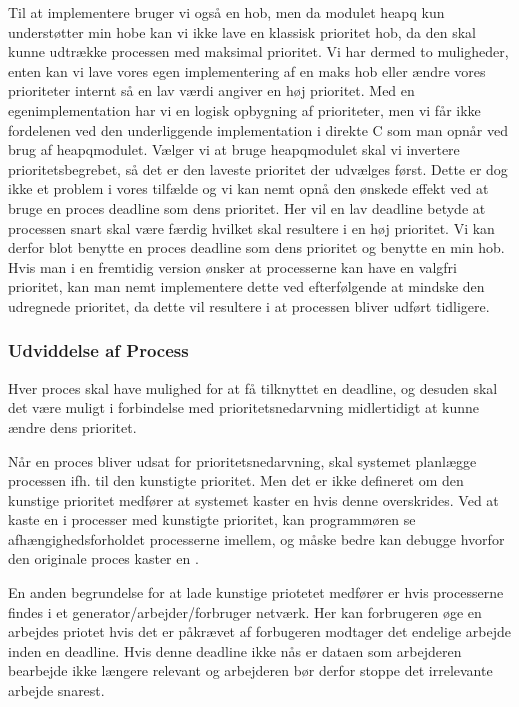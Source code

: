 Til at implementere  bruger vi også en hob, men da modulet heapq  kun understøtter min hobe kan vi ikke lave en klassisk prioritet hob, da den skal kunne udtrække processen med maksimal prioritet. Vi har dermed to muligheder, enten kan vi lave vores egen implementering af en maks hob eller ændre vores prioriteter internt så en lav værdi angiver en høj prioritet. Med en egenimplementation har vi en  logisk opbygning af prioriteter, men vi får ikke fordelenen ved den underliggende implementation i direkte C som man opnår ved brug af heapqmodulet. Vælger vi at bruge heapqmodulet skal vi invertere prioritetsbegrebet, så det er den laveste prioritet der udvælges først. Dette er dog ikke et problem  i vores tilfælde og vi kan nemt opnå den ønskede effekt ved at bruge en proces deadline som dens prioritet. Her vil en lav deadline betyde at processen snart skal være færdig hvilket skal resultere i en høj prioritet.
Vi kan derfor blot benytte en proces deadline som dens prioritet og benytte en min hob. Hvis man i en fremtidig version ønsker at processerne kan have en valgfri prioritet, kan man nemt implementere dette ved efterfølgende at mindske den udregnede prioritet, da dette vil resultere i at processen bliver udført tidligere.


\subsubsection*{Udviddelse af Process}

Hver proces skal have mulighed for at få tilknyttet en deadline, og desuden skal det være muligt i forbindelse med prioritetsnedarvning midlertidigt at kunne ændre dens prioritet.

Når en proces bliver udsat for prioritetsnedarvning, skal systemet planlægge processen ifh. til den kunstigte prioritet. Men det er ikke defineret om den kunstige prioritet medfører at systemet kaster en    hvis  denne overskrides. Ved at kaste en  i processer med kunstigte prioritet, kan programmøren se  afhængighedsforholdet processerne imellem, og måske bedre kan debugge hvorfor den originale proces kaster en . 

En anden begrundelse for at lade kunstige priotetet medfører  er hvis processerne findes i et generator/arbejder/forbruger netværk. Her kan forbrugeren øge en arbejdes priotet hvis det er påkrævet af forbugeren modtager det endelige arbejde inden en deadline. Hvis denne deadline ikke nås er dataen som arbejderen bearbejde ikke længere relevant og arbejderen bør derfor stoppe det irrelevante arbejde snarest. 

